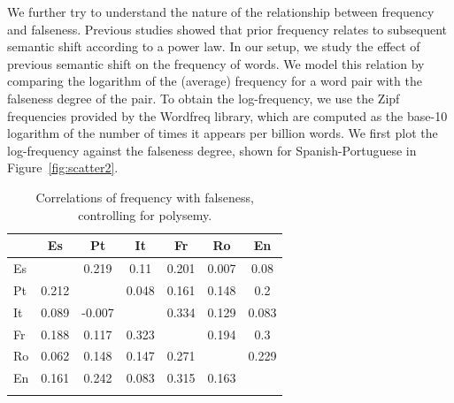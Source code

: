 \documentclass[output=paper]{langsci/langscibook}
\begin{document}
We further try to understand the nature of the relationship between frequency and falseness. Previous studies \citep{hamilton-etal-2016-diachronic} showed that prior frequency relates to subsequent semantic shift according to a power law. In our setup, we study the effect of previous semantic shift on the frequency of words. We model this relation by comparing the logarithm of the (average) frequency for a word pair with the falseness degree of the pair. To obtain the log-frequency, we use the Zipf frequencies provided by the Wordfreq library, which are computed as the base-10 logarithm of the number of times it appears per billion words. We first plot the log-frequency against the falseness degree, shown for Spanish-Portuguese in Figure~\ref{fig:scatter2}. 

\begin{table}[p]
    \begin{tabular}{l  *{6}{S[table-format=-1.3]} }
    \lsptoprule
        &  {Es} & {Pt} & {It} & {Fr} & {Ro} & {En} \\ \midrule
        Es &  & 0.219 & 0.11 & 0.201 & 0.007 & 0.08 \\
        Pt & 0.212 &  & 0.048 & 0.161 & 0.148 & 0.2 \\
        It & 0.089 & -0.007 &  & 0.334 & 0.129 & 0.083 \\
        Fr & 0.188 & 0.117 & 0.323 &  & 0.194 & 0.3 \\
        Ro & 0.062 & 0.148 & 0.147 & 0.271 &  & 0.229 \\
        En & 0.161 & 0.242 & 0.083 & 0.315 & 0.163 &  \\
        \lspbottomrule
    \end{tabular}
    \caption{Correlations of frequency with falseness, controlling for polysemy.\label{tab:freq-corr}}
\end{table}
\end{document}
